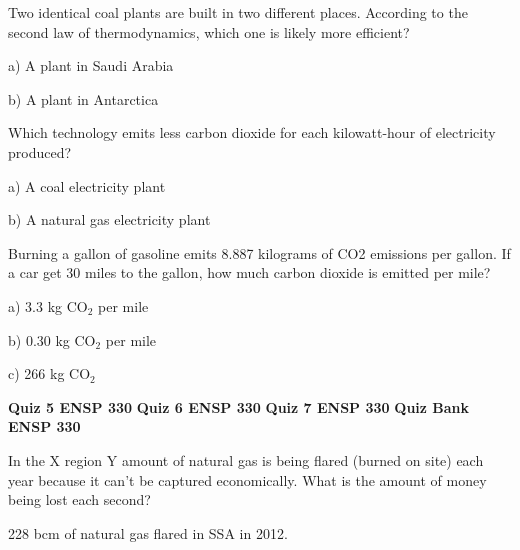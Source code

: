 \documentclass[12pt, oneside]{article}
\begin{document}
\problem{}
Two identical coal plants are built in two different places.  According
to the second law of thermodynamics, which one is likely more efficient?

a) A plant in Saudi Arabia

b) A plant in Antarctica


\problem{}
Which technology emits less carbon dioxide for each kilowatt-hour of
electricity produced?

a) A coal electricity plant

b) A natural gas electricity plant

\problem{}
Burning a gallon of gasoline emits 8.887 kilograms of CO2 emissions per
gallon.  If a car get 30 miles to the gallon, how much carbon dioxide is
emitted per mile?

a) 3.3 kg CO$_2$ per mile %

b) 0.30 kg CO$_2$ per mile

c) 266 kg CO$_2$ %



\newpage
\setcounter{problem}{0}
{\bf Quiz 5 \hfill ENSP 330}
\newpage
\setcounter{problem}{0}
{\bf Quiz 6 \hfill ENSP 330}
\newpage
\setcounter{problem}{0}
{\bf Quiz 7 \hfill ENSP 330}
\newpage
\setcounter{problem}{0}
{\bf Quiz Bank \hfill ENSP 330}

\problem{}
In the X region Y amount of natural gas is being flared (burned on site)
each year because it can't
be captured economically.  What is the amount of money being lost each
second?

228 bcm of natural gas flared in SSA in 2012.
\end{document}
